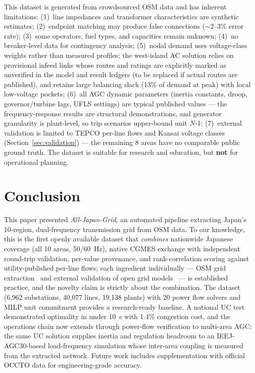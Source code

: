 \documentclass[journal]{IEEEtran}
\begin{document}
This dataset is generated from crowdsourced OSM data and has inherent limitations: (1)~line impedances and transformer characteristics are synthetic estimates; (2)~endpoint matching may produce false connections ($\sim$2--3\% error rate); (3)~some operators, fuel types, and capacities remain unknown; (4)~no breaker-level data for contingency analysis; (5)~nodal demand uses voltage-class weights rather than measured profiles; the west-island AC solution relies on provisional infeed links whose routes and ratings are explicitly marked as unverified in the model and result ledgers (to be replaced if actual routes are published), and retains large balancing slack (13\% of demand at peak) with local low-voltage pockets; (6)~all AGC dynamic parameters (inertia constants, droop, governor/turbine lags, UFLS settings) are typical published values --- the frequency-response results are structural demonstrations, and generator granularity is plant-level, so trip scenarios upper-bound unit $N$-1; (7)~external validation is limited to TEPCO per-line flows and Kansai voltage classes (Section~\ref{sec:validation}) --- the remaining 8 areas have no comparable public ground truth. The dataset is suitable for research and education, but \textbf{not} for operational planning.

\section{Conclusion}

This paper presented \textit{All-Japan-Grid}, an automated pipeline extracting Japan's 10-region, dual-frequency transmission grid from OSM data. To our knowledge, this is the first openly available dataset that \textit{combines} nationwide Japanese coverage (all 10 areas, 50/60~Hz), native CGMES exchange with independent round-trip validation, per-value provenance, and rank-correlation scoring against utility-published per-line flows; each ingredient individually --- OSM grid extraction~\cite{medjroubi2017,arderne2020,xiong2025} and external validation of open grid models~\cite{simbench} --- is established practice, and the novelty claim is strictly about the combination. The dataset (6,962 substations, 40,077 lines, 19,138 plants) with 20 power flow solvers and MILP unit commitment provides a research-ready baseline. A national UC test demonstrated optimality in under 10~s with 1.4\% congestion cost, and the operations chain now extends through power-flow verification to multi-area AGC: the same UC solution supplies inertia and regulation headroom to an IEEJ-AGC30-based load-frequency simulation whose inter-area coupling is measured from the extracted network. Future work includes supplementation with official OCCTO data for engineering-grade accuracy.
\end{document}
